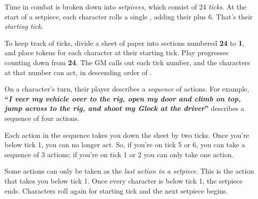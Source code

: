 
Time in combat is broken down into \emph{setpieces}, which consist of 24 \emph{ticks}. At the start of a setpiece, each character rolls a single , adding their \stat{\statSkill} plus 6. That's their \emph{starting tick}.

To keep track of ticks, divide a sheet of paper into sections numbered \textbf{24} to \textbf{1}, and place tokens for each character at their starting tick. Play progresses counting down from \textbf{24}. The GM calls out each tick number, and the characters at that number can act, in descending order of \stat{\statSkill}.

On a character's turn, their player describes a \emph{sequence} of actions. For example, \textbf{``\emph{I veer my vehicle over to the rig, open my door and climb on top, jump across to the rig, and shoot my Glock at the driver}''} describes a sequence of four actions.

Each action in the sequence takes you down the sheet by two ticks. Once you're below tick 1, you can no longer act. So, if you're on tick 5 or 6, you can take a sequence of 3 actions; if you're on tick 1 or 2 you can only take one action.

Some actions can only be taken as the \emph{last action in a setpiece}. This is the action that takes you below tick 1. Once every character is below tick 1, the setpiece ends. Characters roll again for starting tick and the next setpiece begins.
